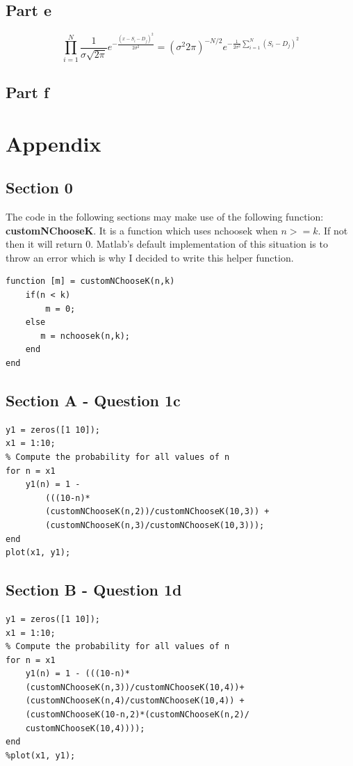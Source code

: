 \documentclass{article}
\begin{document}
\subsection*{Part e}

\begin{equation*}
    \prod_{i = 1}^N\frac{1}{\sigma\sqrt{2\pi}} e^{-\frac{(x - S_{i} - D_{j})^2}{2\sigma^2}}
    = (\sigma^{2}2\pi)^{-N/2}e^{-\frac{1}{2\sigma^2}\sum_{i = 1}^N(S_{i} - D_{j})^2}
\end{equation*}
\subsection*{Part f}


\section*{Appendix}
\subsection*{Section 0}
The code in the following sections may make use of the following function:
\textbf{customNChooseK}. It is a function which uses nchoosek when $ n >= k $.
If not then it will return 0. Matlab's default implementation of this situation is
to throw an error which is why I decided to write this helper function.
\begin{lstlisting}
function [m] = customNChooseK(n,k)
    if(n < k)
        m = 0;
    else
       m = nchoosek(n,k); 
    end
end
\end{lstlisting}

\subsection*{Section A - Question 1c}
\begin{lstlisting}
y1 = zeros([1 10]);
x1 = 1:10;
% Compute the probability for all values of n
for n = x1
    y1(n) = 1 - 
        (((10-n)*
        (customNChooseK(n,2))/customNChooseK(10,3)) +
        (customNChooseK(n,3)/customNChooseK(10,3)));
end
plot(x1, y1);
\end{lstlisting}

\subsection*{Section B - Question 1d}
\begin{lstlisting}
y1 = zeros([1 10]);
x1 = 1:10;
% Compute the probability for all values of n
for n = x1
    y1(n) = 1 - (((10-n)*
    (customNChooseK(n,3))/customNChooseK(10,4))+
    (customNChooseK(n,4)/customNChooseK(10,4)) + 
    (customNChooseK(10-n,2)*(customNChooseK(n,2)/
    customNChooseK(10,4))));
end
%plot(x1, y1);
\end{lstlisting}
\end{document}
